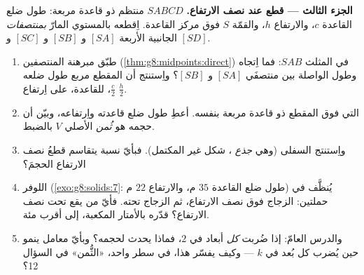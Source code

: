 \begin{problem}
\medskip
\noindent\textbf{الجزء الثالث --- قطع  عند نصف الارتفاع.}
$SABCD$  منتظم ذو قاعدة مربعة: طول ضلع القاعدة $c$، والارتفاع
$h$، والقمّة $S$ فوق مركز القاعدة. اِقطعه بالمستوي
المارّ \emph{بمنتصفات}  الجانبية الأربعة $[SA]$
و $[SB]$ و $[SC]$ و $[SD]$.
\begin{enumerate}[resume]
  \item طبّق مبرهنة المنتصفين
        (\cref{thm:g8:midpoints:direct}) في المثلث $SAB$:
        فما اِتجاه وطول  الواصلة بين
        منتصفَي $[SA]$ و $[SB]$؟ واِستنتج أن المقطع
        مربع طول ضلعه $\frac{c}{2}$،  للقاعدة،
        على اِرتفاع $\frac{h}{2}$.
  \item {} التي فوق المقطع  ذو قاعدة مربعة بنفسه.
        أعطِ طول ضلع قاعدته واِرتفاعه، وبيّن أن حجمه
        هو \emph{ثُمن}  الأصلي $V$ بالضبط.
  \item واِستنتج   السفلى (وهي \emph{جذع }،
        شكل  غير المكتمل). فبأيّ نسبة يتقاسم
        قطعُ نصف الارتفاع الحجمَ؟
  \item {} اللوفر (\cref{exo:g8:solids:7}: طول ضلع القاعدة
        $35$ م، والارتفاع $22$ م) يُنظَّف في حملتين: الزجاج
        فوق نصف الارتفاع، ثم الزجاج تحته. فأيّ
         من \emph{} يقع تحت نصف الارتفاع؟
        قدّره بالأمتار المكعبة، إلى أقرب مئة.
  \item والدرس العامّ: إذا ضُربت \emph{كل} أبعاد
         في $2$، فماذا يحدث
        لحجمه؟ وبأيّ معامل ينمو  حين يُضرب كل
        بُعد في $k$ --- وكيف يفسّر هذا، في سطر واحد،
        «الثُّمن» في السؤال 12؟
\end{enumerate}
\end{problem}
